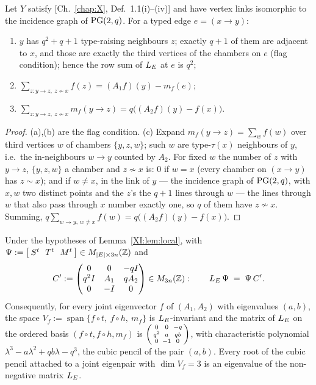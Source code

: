 \begin{lemma}\label{XI:lem:local}
Let $Y$ satisfy {\rm[Ch.~\ref{chap:X}, Def.~1.1(i)--(iv)]} and have vertex links isomorphic to the
incidence graph of $\mathrm{PG}(2,q)$. For a typed edge $e=(x\to y)$:
\begin{enumerate}
\item[(a)] $y$ has $q^{2}+q+1$ type-raising neighbours $z$; exactly $q+1$ of them are
adjacent to $x$, and those are exactly the third vertices of the chambers on $e$ (flag
condition); hence the row sum of $L_E$ at $e$ is $q^{2}$;
\item[(b)] $\sum_{z\colon y\to z,\ z\not\sim x}f(z)=(A_1f)(y)-m_f(e)$;
\item[(c)] $\sum_{z\colon y\to z,\ z\not\sim x}m_f(y\to z)=q\bigl((A_2f)(y)-f(x)\bigr)$.
\end{enumerate}
\end{lemma}

\begin{proof}
(a),(b) are the flag condition. (c) Expand $m_f(y\to z)=\sum_wf(w)$ over third vertices
$w$ of chambers $\{y,z,w\}$; such $w$ are type-$\tau(x)$ neighbours of $y$, i.e.\ the
in-neighbours $w\to y$ counted by $A_2$. For fixed $w$ the number of $z$ with $y\to z$,
$\{y,z,w\}$ a chamber and $z\not\sim x$ is: $0$ if $w=x$ (every chamber on $(x\to y)$ has
$z\sim x$); and if $w\ne x$, in the link of $y$ --- the incidence graph of $\mathrm{PG}(2,q)$, with
$x,w$ two distinct points and the $z$'s the $q+1$ lines through $w$ --- the lines through $w$
that also pass through $x$ number exactly one, so $q$ of them have $z\not\sim x$. Summing,
$q\sum_{w\to y,\,w\ne x}f(w)=q\bigl((A_2f)(y)-f(x)\bigr)$.
\end{proof}

\begin{theorem}\label{XI:thm:edge}
Under the hypotheses of Lemma~\ref{XI:lem:local}, with
$\Psi:=\bigl[\,S^{t}\ \ T^{t}\ \ M^{t}\,\bigr]\in M_{|E|\times3n}(\mathbb{Z})$ and
\[
C':=\begin{pmatrix}0&0&-qI\\ q^{2}I&A_1&qA_2\\ 0&-I&0\end{pmatrix}\in M_{3n}(\mathbb{Z}):
\qquad
L_E\,\Psi\;=\;\Psi\,C' .
\]
Consequently, for every joint eigenvector $f$ of $(A_1,A_2)$ with eigenvalues $(a,b)$, the
space $V_f:=\operatorname{span}\{f\circ t,\ f\circ h,\ m_f\}$ is $L_E$-invariant and the matrix
of $L_E$ on the ordered basis $(f\circ t,f\circ h,m_f)$ is
$\begin{psmallmatrix}0&0&-q\\ q^{2}&a&qb\\ 0&-1&0\end{psmallmatrix}$, with characteristic
polynomial $\lambda^{3}-a\lambda^{2}+qb\lambda-q^{3}$, the cubic pencil of the pair $(a,b)$.
Every root of the
cubic pencil attached to a joint eigenpair with $\dim V_f=3$ is an eigenvalue of the
non-negative matrix $L_E$.
\end{theorem}

